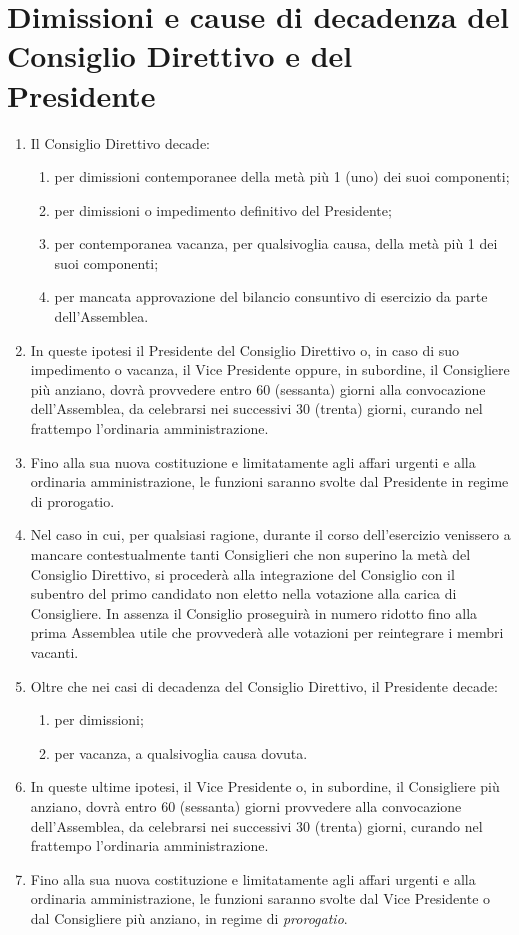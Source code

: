 \documentclass{djtsasddoc}
\begin{document}
	\section{Dimissioni e cause di decadenza del Consiglio Direttivo e del Presidente}
	\begin{enumerate}
		\item Il Consiglio Direttivo decade:
		\begin{enumerate}
			\item per dimissioni contemporanee della metà più 1 (uno) dei suoi componenti;
			\item per dimissioni o impedimento definitivo del Presidente;
			\item per contemporanea vacanza, per qualsivoglia causa, della metà più 1 dei suoi componenti;
			\item per mancata approvazione del bilancio consuntivo di esercizio da parte dell'Assemblea.
		\end{enumerate}
		\item In queste ipotesi il Presidente del Consiglio Direttivo o, in caso di suo impedimento o vacanza, il Vice Presidente oppure, in subordine, il Consigliere più anziano, dovrà provvedere entro 60 (sessanta) giorni alla convocazione dell'Assemblea, da celebrarsi nei successivi 30 (trenta) giorni, curando nel frattempo l'ordinaria amministrazione.
		\item Fino alla sua nuova costituzione e limitatamente agli affari urgenti e alla ordinaria amministrazione, le funzioni saranno svolte dal Presidente in regime di prorogatio.
		\item Nel caso in cui, per qualsiasi ragione, durante il corso dell'esercizio venissero a mancare contestualmente tanti Consiglieri che non superino la metà del Consiglio Direttivo, si procederà alla  integrazione del Consiglio con il subentro del primo candidato non eletto nella votazione alla carica di Consigliere. In assenza il  Consiglio proseguirà in numero ridotto fino alla prima Assemblea utile che provvederà alle votazioni per reintegrare i membri vacanti.
		\item Oltre che nei casi di decadenza del Consiglio Direttivo, il Presidente decade:
		\begin{enumerate}
			\item per dimissioni;
			\item per vacanza, a qualsivoglia causa dovuta.
		\end{enumerate}
		\item In queste ultime ipotesi, il Vice Presidente o, in subordine, il Consigliere più anziano, dovrà entro 60 (sessanta) giorni provvedere alla convocazione dell'Assemblea, da celebrarsi nei successivi 30 (trenta) giorni, curando nel frattempo l'ordinaria amministrazione.
		\item Fino alla sua nuova costituzione e limitatamente agli affari urgenti e alla ordinaria amministrazione, le funzioni saranno svolte dal Vice Presidente o dal Consigliere più anziano, in regime di \textit{prorogatio}.
	\end{enumerate}
	
\end{document}
